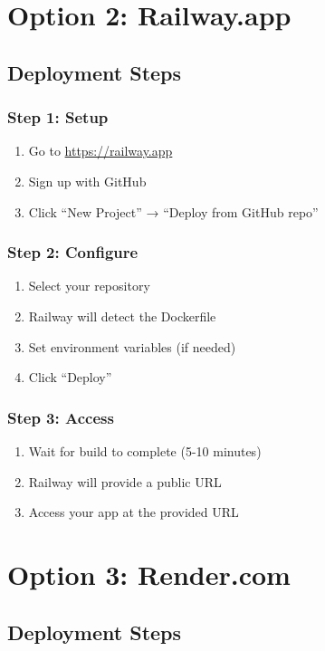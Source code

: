 \documentclass[11pt,a4paper]{article}
\begin{document}
\section{Option 2: Railway.app}

\subsection{Deployment Steps}

\subsubsection{Step 1: Setup}
\begin{enumerate}
    \item Go to \url{https://railway.app}
    \item Sign up with GitHub
    \item Click ``New Project'' → ``Deploy from GitHub repo''
\end{enumerate}

\subsubsection{Step 2: Configure}
\begin{enumerate}
    \item Select your repository
    \item Railway will detect the Dockerfile
    \item Set environment variables (if needed)
    \item Click ``Deploy''
\end{enumerate}

\subsubsection{Step 3: Access}
\begin{enumerate}
    \item Wait for build to complete (5-10 minutes)
    \item Railway will provide a public URL
    \item Access your app at the provided URL
\end{enumerate}

\section{Option 3: Render.com}

\subsection{Deployment Steps}
\end{document}
